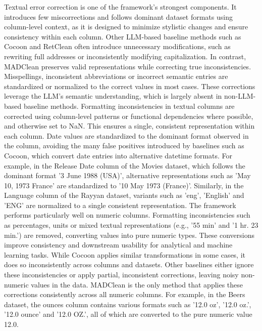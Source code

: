Textual error correction is one of the framework's strongest components. 
It introduces few miscorrections and follows dominant dataset formats using column-level context, as it is designed to minimize stylistic changes and ensure consistency within each column. 
Other LLM-based baseline methods such as Cocoon and RetClean often introduce unnecessary modifications, such as rewriting full addresses or inconsistently modifying capitalization. 
In contrast, MADClean preserves valid representations while correcting true inconsistencies. 
Misspellings, inconsistent abbreviations or incorrect semantic entries are standardized or normalized to the correct values in most cases. 
These corrections leverage the LLM's semantic understanding, which is largely absent in non-LLM-based baseline methods.
\newline\newline
Formatting inconsistencies in textual columns are corrected using column-level patterns or functional dependencies where possible, and otherwise set to NaN. 
This ensures a single, consistent representation within each column. 
Date values are standardized to the dominant format observed in the column, avoiding the many false positives introduced by baselines such as Cocoon, which convert date entries into alternative datetime formats.
For example, in the Release Date column of the Movies dataset, which follows the dominant format '3 June 1988 (USA)', alternative representations such as 'May 10, 1973 France' are standardized to '10 May 1973 (France)'. 
Similarly, in the Language column of the Rayyan dataset, variants such as 'eng', 'English' and 'ENG' are normalized to a single consistent representation.
\newline\newline
The framework performs particularly well on numeric columns. 
Formatting inconsistencies such as percentages, units or mixed textual representations (e.g., '55 min' and '1 hr. 23 min.') are removed, converting values into pure numeric types. 
These conversions improve consistency and downstream usability for analytical and machine learning tasks. 
While Cocoon applies similar transformations in some cases, it does so inconsistently across columns and datasets.
Other baselines either ignore these inconsistencies or apply partial, inconsistent corrections, leaving noisy non-numeric values in the data. 
MADClean is the only method that applies these corrections consistently across all numeric columns. 
For example, in the Beers dataset, the ounces column contains various formats such as '12.0 oz', '12.0 oz.', '12.0 ounce' and '12.0 OZ.', all of which are converted to the pure numeric value 12.0. 
